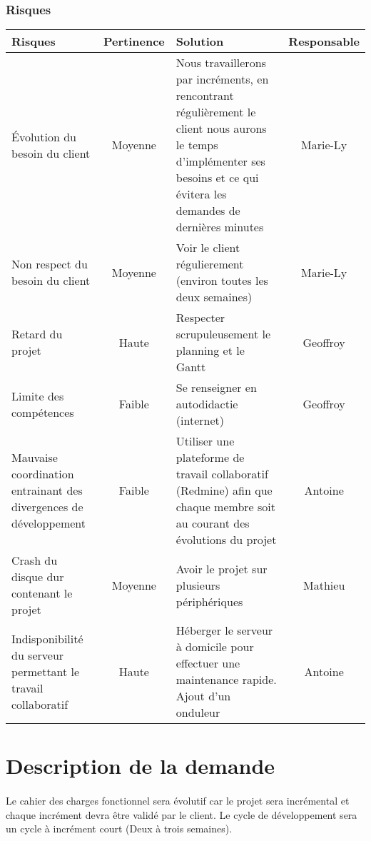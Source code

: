 \documentclass[12pt,a4paper,openany]{article}
\begin{document}
		\subsubsection*{Risques}
		\begin{center}
		\begin{tabular}{|p{5.5cm}|c|p{6.5cm}|c|}
				\hline
				\textbf{Risques} & \textbf{Pertinence} & \textbf{Solution} & \textbf{Responsable} \\
				\hline
				Évolution du besoin du client & Moyenne &  Nous travaillerons par incréments, 
				en rencontrant régulièrement le client  nous aurons le temps d'implémenter ses besoins et 
				ce qui évitera les demandes de dernières minutes & Marie-Ly \\ 
				\hline
				Non respect du besoin du client & Moyenne & Voir le client régulierement (environ toutes les deux semaines) & Marie-Ly\\ 
				\hline
				Retard du projet & Haute & Respecter scrupuleusement le planning et le Gantt & Geoffroy\\
				\hline
				Limite des compétences & Faible & Se renseigner en autodidactie (internet)& Geoffroy\\ 
				\hline
				Mauvaise coordination entrainant des divergences de développement& Faible & Utiliser une plateforme de travail collaboratif (Redmine) afin que
				chaque membre soit au courant des évolutions du projet & Antoine \\
				\hline
				Crash du disque dur contenant le projet & Moyenne & Avoir le projet sur plusieurs périphériques & Mathieu\\
				\hline
				Indisponibilité du serveur permettant le travail collaboratif & Haute& Héberger le serveur à domicile pour effectuer une maintenance rapide.
				Ajout d'un onduleur & Antoine  \\
				\hline
			\end{tabular}
		\end{center}	
	\section{Description de la demande}
	\paragraph{}
		Le cahier des charges fonctionnel sera évolutif car le projet sera incrémental et chaque incrément devra 
		être validé par le client. Le cycle de développement sera un cycle à incrément court (Deux à trois semaines).
\end{document}
